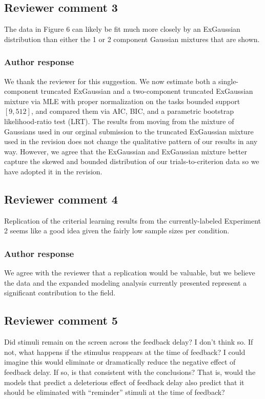 \documentclass[12pt]{article}
\begin{document}
\subsection{Reviewer comment 3}
The data in Figure 6 can likely be fit much more closely by
an ExGaussian distribution than either the 1 or 2 component
Gaussian mixtures that are shown.

\subsubsection{Author response}
We thank the reviewer for this suggestion. We now estimate
both a single-component truncated ExGaussian and a
two-component truncated ExGaussian mixture via MLE with
proper normalization on the tasks bounded support $[9,
512]$, and compared them via AIC, BIC, and a parametric
bootstrap likelihood-ratio test (LRT).  The results from
moving from the mixture of Gaussians used in our orginal
submission to the truncated ExGaussian mixture used in the
revision does not change the qualitative pattern of our
results in any way. However, we agree that the ExGaussian
and ExGaussian mixture better capture the skewed and bounded
distribution of our trials-to-criterion data so we have
adopted it in the revision. 

\subsection{Reviewer comment 4}
Replication of the criterial learning results from the
currently-labeled Experiment 2 seems like a good idea given
the fairly low sample sizes per condition.

\subsubsection{Author response}
We agree with the reviewer that a replication would be
valuable, but we believe the data and the expanded modeling
analysis currently presented represent a significant
contribution to the field. 

\subsection{Reviewer comment 5}
Did stimuli remain on the screen across the feedback delay?
I don't think so. If not, what happens if the stimulus
reappears at the time of feedback? I could imagine this
would eliminate or dramatically reduce the negative effect
of feedback delay. If so, is that consistent with the
conclusions? That is, would the models that predict a
deleterious effect of feedback delay also predict that it
should be eliminated with ``reminder'' stimuli at the time
of feedback?
\end{document}
